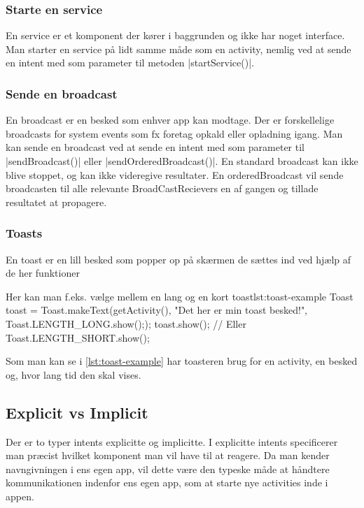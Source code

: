 \subsubsection{Starte en service}

En service er et komponent der kører i baggrunden og ikke har noget interface. Man starter en service på lidt samme måde som en activity, nemlig ved at sende en intent med som parameter til metoden \JavaInline|startService()|.

\subsubsection{Sende en broadcast}

En broadcast er en besked som enhver app kan modtage. Der er forskellelige broadcasts for system events som fx foretag opkald eller opladning igang. Man kan sende en broadcast ved at sende en intent med som parameter til \JavaInline|sendBroadcast()| eller \JavaInline|sendOrderedBroadcast()|.
En standard broadcast kan ikke blive stoppet, og kan ikke videregive resultater. En orderedBroadcast vil sende broadcasten til alle relevante BroadCastRecievers en af gangen og tillade resultatet at propagere.

\subsubsection{Toasts}

En toast er en lill besked som popper op på skærmen de sættes ind ved hjælp af de her funktioner  

\begin{JavaCode}{Her kan man f.eks. vælge mellem en lang og en kort toast}{lst:toast-example}
	Toast toast = Toast.makeText(getActivity(), "Det her er min toast besked!", Toast.LENGTH_LONG.show(););
	toast.show();
	// Eller Toast.LENGTH_SHORT.show();
\end{JavaCode}

Som man kan se i \autoref{lst:toast-example} har toasteren brug for en activity, en besked og, hvor lang tid den skal vises.

\subsection{Explicit vs Implicit}

Der er to typer intents explicitte og implicitte. I explicitte intents specificerer man præcist hvilket komponent man vil have til at reagere. Da man kender navngivningen i ens egen app, vil dette være den typeske måde at håndtere kommunikationen indenfor ens egen app, som at starte nye activities inde i appen.

